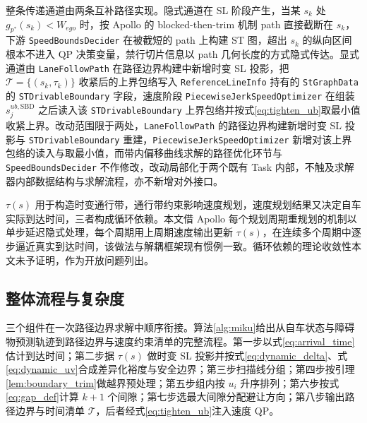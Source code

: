 \documentclass[a4paper,11pt]{ctexart}
\theoremstyle{definition}
\begin{document}
整条传递通道由两条互补路径实现。隐式通道在 SL 阶段产生，当某 $s_k$ 处 $g_{p^{*}}(s_k)<W_{ego}$ 时，按 Apollo 的 blocked-then-trim 机制 path 直接截断在 $s_k$，下游 \texttt{SpeedBoundsDecider} 在被截短的 path 上构建 ST 图，超出 $s_k$ 的纵向区间根本不进入 QP 决策变量，禁行切片信息以 path 几何长度的方式隐式传达。显式通道由 \texttt{LaneFollowPath} 在路径边界构建中新增时变 SL 投影，把 $\mathcal{T}=\{(s_k, \tau_k)\}$ 收紧后的上界包络写入 \texttt{ReferenceLineInfo} 持有的 \texttt{StGraphData} 的 \texttt{STDrivableBoundary} 字段，速度阶段 \texttt{PiecewiseJerkSpeedOptimizer} 在组装 $s_j^{ub,\mathrm{SBD}}$ 之后读入该 \texttt{STDrivableBoundary} 上界包络并按式\eqref{eq:tighten_ub}取最小值收紧上界。改动范围限于两处，\texttt{LaneFollowPath} 的路径边界构建新增时变 SL 投影与 \texttt{STDrivableBoundary} 重建，\texttt{PiecewiseJerkSpeedOptimizer} 新增对该上界包络的读入与取最小值，而带内偏移曲线求解的路径优化环节与 \texttt{SpeedBoundsDecider} 不作修改，改动局部化于两个既有 Task 内部，不触及求解器内部数据结构与求解流程，亦不新增对外接口。

$\tau(s)$ 用于构造时变通行带，通行带约束影响速度规划，速度规划结果又决定自车实际到达时间，三者构成循环依赖。本文借 Apollo 每个规划周期重规划的机制以单步延迟隐式处理，每个周期用上周期速度输出更新 $\tau(s)$，在连续多个周期中逐步逼近真实到达时间，该做法与解耦框架现有惯例一致。循环依赖的理论收敛性本文未予证明，作为开放问题列出。

\subsection{整体流程与复杂度}
\label{sec:method_algorithm}

三个组件在一次路径边界求解中顺序衔接。算法\ref{alg:miku}给出从自车状态与障碍物预测轨迹到路径边界与速度约束清单的完整流程。第一步以式\eqref{eq:arrival_time}估计到达时间；第二步据 $\tau(s)$ 做时变 SL 投影并按式\eqref{eq:dynamic_delta}、式\eqref{eq:dynamic_uv}合成差异化裕度与安全边界；第三步扫描线分组；第四步按引理\ref{lem:boundary_trim}做越界预处理；第五步组内按 $u_i$ 升序排列；第六步按式\eqref{eq:gap_def}计算 $k+1$ 个间隙；第七步选最大间隙分配避让方向；第八步输出路径边界与时间清单 $\mathcal{T}$，后者经式\eqref{eq:tighten_ub}注入速度 QP。
\end{document}
